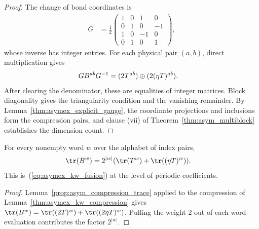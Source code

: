 \begin{proof}
    \leanok
    The change of bond coordinates is
    \begin{align}
        G & =\frac12\begin{pmatrix}
                        1 & 0 & 1  & 0  \\
                        0 & 1 & 0  & -1 \\
                        1 & 0 & -1 & 0  \\
                        0 & 1 & 0  & 1
                    \end{pmatrix},
        \label{eq:asymex_kw_gauge}
    \end{align}
    whose inverse has integer entries. For each physical pair $(a,b)$,
    direct multiplication gives
    \begin{align}
        GB^{ab}G^{-1} & =(2T^{ab})\oplus(2(\eta T)^{ab}).
        \notag
    \end{align}
    After clearing the denominator, these are equalities of integer
    matrices. Block diagonality gives the triangularity condition and
    the vanishing remainder. By Lemma~\ref{thm:asymex_explicit_gauge},
    the coordinate projections and inclusions form the compression pairs,
    and clause (vii) of Theorem~\ref{thm:asym_multiblock} establishes
    the dimension count.
\end{proof}

\begin{lemma}
    \label{thm:asymex_kw_trace}
    \leanok
    For every nonempty word $w$ over the alphabet of index pairs,
    \begin{align}
        \tr(B^w) & =2^{|w|}(\tr(T^w)+\tr((\eta T)^w)).
        \label{eq:asymex_kw_trace}
    \end{align}
    This is~(\ref{eq:asymex_kw_fusion}) at the level of periodic
    coefficients.
\end{lemma}

\begin{proof}
    \leanok
    Lemma~\ref{prop:asym_compression_trace} applied to the
    compression of Lemma~\ref{thm:asymex_kw_compression} gives
    $\tr(B^w)=\tr((2T)^w)+\tr((2\eta T)^w)$. Pulling the weight $2$ out
    of each word evaluation contributes the factor $2^{|w|}$.
\end{proof}

